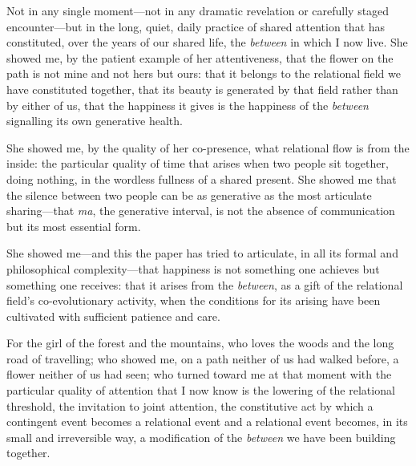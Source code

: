 \vspace{0.6em}

\noindent
{}

\vspace{0.6em}

\noindent
Not in any single moment---not in any dramatic revelation or carefully staged encounter---but in the long, quiet, daily practice of shared attention that has constituted, over the years of our shared life, the \emph{between} in which I now live. She showed me, by the patient example of her attentiveness, that the flower on the path is not mine and not hers but ours: that it belongs to the relational field we have constituted together, that its beauty is generated by that field rather than by either of us, that the happiness it gives is the happiness of the \emph{between} signalling its own generative health.

\vspace{0.6em}

\noindent
She showed me, by the quality of her co-presence, what relational flow is from the inside: the particular quality of time that arises when two people sit together, doing nothing, in the wordless fullness of a shared present. She showed me that the silence between two people can be as generative as the most articulate sharing---that \emph{ma}, the generative interval, is not the absence of communication but its most essential form.

\vspace{0.6em}

\noindent
She showed me---and this the paper has tried to articulate, in all its formal and philosophical complexity---that happiness is not something one achieves but something one receives: that it arises from the \emph{between}, as a gift of the relational field's co-evolutionary activity, when the conditions for its arising have been cultivated with sufficient patience and care.

\vspace{0.6em}

\noindent
{} For the girl of the forest and the mountains, who loves the woods and the long road of travelling; who showed me, on a path neither of us had walked before, a flower neither of us had seen; who turned toward me at that moment with the particular quality of attention that I now know is the lowering of the relational threshold, the invitation to joint attention, the constitutive act by which a contingent event becomes a relational event and a relational event becomes, in its small and irreversible way, a modification of the \emph{between} we have been building together.

